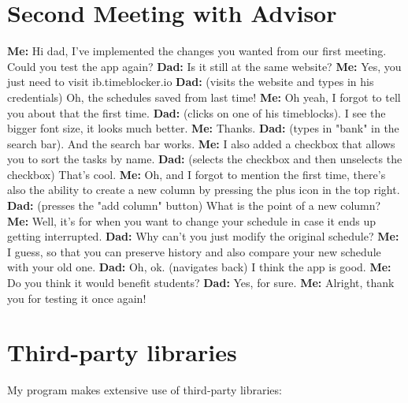 \documentclass[12pt]{report}
\begin{document}
\section*{Second Meeting with Advisor}
\textbf{Me:} Hi dad, I've implemented the changes you wanted from our first meeting. Could you test the app again?
\textbf{Dad:} Is it still at the same website?
\textbf{Me:} Yes, you just need to visit ib.timeblocker.io
\textbf{Dad:} (visits the website and types in his credentials) Oh, the schedules saved from last time!
\textbf{Me:} Oh yeah, I forgot to tell you about that the first time.
\textbf{Dad:} (clicks on one of his timeblocks). I see the bigger font size, it looks much better.
\textbf{Me:} Thanks.
\textbf{Dad:} (types in "bank" in the search bar). And the search bar works.
\textbf{Me:} I also added a checkbox that allows you to sort the tasks by name.
\textbf{Dad:} (selects the checkbox and then unselects the checkbox) That's cool.
\textbf{Me:} Oh, and I forgot to mention the first time, there's also the ability to create a new column by pressing the plus icon in the top right.
\textbf{Dad:} (presses the "add column" button) What is the point of a new column?
\textbf{Me:} Well, it's for when you want to change your schedule in case it ends up getting interrupted.
\textbf{Dad:} Why can't you just modify the original schedule?
\textbf{Me:} I guess, so that you can preserve history and also compare your new schedule with your old one.
\textbf{Dad:} Oh, ok. (navigates back) I think the app is good.
\textbf{Me:} Do you think it would benefit students?
\textbf{Dad:} Yes, for sure.
\textbf{Me:} Alright, thank you for testing it once again!
\egroup


\section*{Third-party libraries}
My program makes extensive use of third-party libraries:
\end{document}

